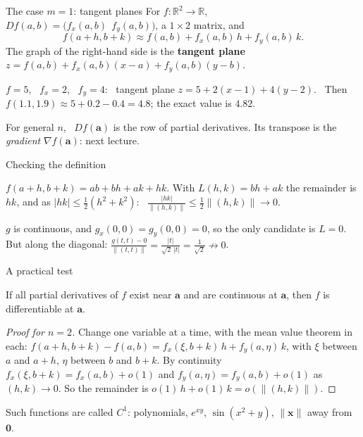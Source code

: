 \documentclass[10pt]{wosm-slides}
\newcommand{\R}{\mathbb{R}}
\newcommand{\norm}[1]{\lVert #1 \rVert}
\newcommand{\vx}{\mathbf{x}}
\newcommand{\va}{\mathbf{a}}
\begin{document}
\begin{frame}{The case $m = 1$: tangent planes}
  For $f\colon \R^2 \to \R$, \ $Df(a, b) = \bigl(f_x(a, b) \ \ f_y(a, b)\bigr)$, a $1 \times 2$ matrix, and
  \[ f(a + h, b + k) \approx f(a, b) + f_x(a, b)\, h + f_y(a, b)\, k . \]
  The graph of the right-hand side is the \textbf{tangent plane}
  $z = f(a, b) + f_x(a, b)(x - a) + f_y(a, b)(y - b)$.
  \pause
  \begin{example}[$f(x, y) = x^2 + y^2$ at $(1, 2)$]
    $f = 5$, \ $f_x = 2$, \ $f_y = 4$: \ tangent plane $z = 5 + 2(x - 1) + 4(y - 2)$. \
    Then $f(1.1, 1.9) \approx 5 + 0.2 - 0.4 = 4.8$; the exact value is $4.82$.
  \end{example}
  {\small For general $n$, \ $Df(\va)$ is the row of partial derivatives. Its transpose is the
  \emph{gradient} $\nabla f(\va)$: next lecture.\par}
\end{frame}

\begin{frame}{Checking the definition}
  \begin{example}[$f(x, y) = xy$ is differentiable at every $(a, b)$]
    $f(a + h, b + k) = ab + bh + ak + hk$. With $L(h, k) = bh + ak$ the remainder is $hk$, and as
    $|hk| \le \frac12(h^2 + k^2)$: \ $\frac{|hk|}{\norm{(h, k)}} \le \frac12 \norm{(h, k)} \to 0$.
  \end{example}
  \pause
  \begin{example}[$g(x, y) = \sqrt{|xy|}$ is not differentiable at $(0, 0)$]
    $g$ is continuous, and $g_x(0, 0) = g_y(0, 0) = 0$, so the only candidate is $L = 0$.
    But along the diagonal: $\frac{g(t, t) - 0}{\norm{(t, t)}} = \frac{|t|}{\sqrt2\, |t|} = \frac{1}{\sqrt2}
    \not\to 0$.
  \end{example}
\end{frame}

\begin{frame}{A practical test}
  \begin{theorem}
    If all partial derivatives of $f$ exist near $\va$ and are continuous at $\va$, then $f$ is
    differentiable at $\va$.
  \end{theorem}
  \pause
  \begin{proof}[Proof for $n = 2$]
    Change one variable at a time, with the mean value theorem in each:
    $f(a + h, b + k) - f(a, b) = f_x(\xi, b + k)\, h + f_y(a, \eta)\, k$,
    with $\xi$ between $a$ and $a + h$, $\eta$ between $b$ and $b + k$. By continuity
    $f_x(\xi, b + k) = f_x(a, b) + o(1)$ and $f_y(a, \eta) = f_y(a, b) + o(1)$ as $(h, k) \to 0$.
    So the remainder is $o(1)\, h + o(1)\, k = o(\norm{(h, k)})$.
  \end{proof}
  {\small Such functions are called $C^1$: polynomials, $e^{xy}$, $\sin(x^2 + y)$, $\norm{\vx}$ away
  from $\mathbf 0$.\par}
\end{frame}
\end{document}

